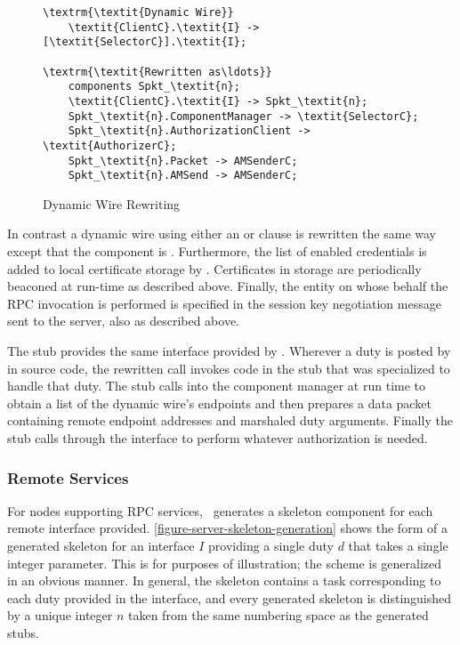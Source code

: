 \begin{figure}[!t]
\begin{textbox}{3.0in}
\begin{Verbatim}[commandchars=\\\{\}, fontsize=\small]
\textrm{\textit{Dynamic Wire}}
    \textit{ClientC}.\textit{I} -> [\textit{SelectorC}].\textit{I};

\textrm{\textit{Rewritten as\ldots}}
    components Spkt_\textit{n};
    \textit{ClientC}.\textit{I} -> Spkt_\textit{n};
    Spkt_\textit{n}.ComponentManager -> \textit{SelectorC};
    Spkt_\textit{n}.AuthorizationClient -> \textit{AuthorizerC};
    Spkt_\textit{n}.Packet -> AMSenderC;
    Spkt_\textit{n}.AMSend -> AMSenderC;
\end{Verbatim}
\end{textbox}
\caption{Dynamic Wire Rewriting}
\label{figure-dynamic-wire-rewriting}
\end{figure}

In contrast a dynamic wire using either an  or  clause is rewritten the
same way except that the  component is . Furthermore,
the list of enabled credentials is added to local certificate storage by \Sprocket. Certificates
in storage are periodically beaconed at run-time as described above. Finally, the entity on
whose behalf the RPC invocation is performed is specified in the session key negotiation message
sent to the server, also as described above.

The  stub provides the same interface provided by
. Wherever a duty is posted by  in source code,
the rewritten call invokes code in the stub that was specialized to handle that duty. The stub
calls into the component manager at run time to obtain a list of the dynamic wire's endpoints
and then prepares a data packet containing remote endpoint addresses and marshaled duty
arguments. Finally the stub calls through the  interface to perform
whatever authorization is needed.

\subsubsection{Remote Services}

For nodes supporting RPC services, \Sprocket\ generates a skeleton component for each remote
interface provided. \autoref{figure-server-skeleton-generation} shows the form of a generated
skeleton for an interface $I$ providing a single duty $d$ that takes a single integer parameter.
This is for purposes of illustration; the scheme is generalized in an obvious manner. In
general, the skeleton contains a task corresponding to each duty provided in the interface, and
every generated skeleton is distinguished by a unique integer $n$ taken from the same numbering
space as the generated stubs.

